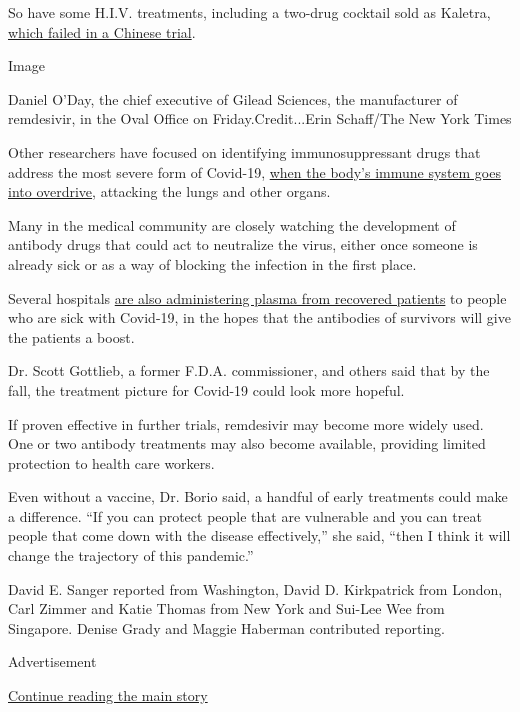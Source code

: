 So have some H.I.V. treatments, including a two-drug cocktail sold as
Kaletra,
\href{https://www.nytimes.com/2020/03/18/health/coronavirus-antiviral-drugs-fail.html}{which
failed in a Chinese trial}.

Image

Daniel O'Day, the chief executive of Gilead Sciences, the manufacturer
of remdesivir, in the Oval Office on Friday.Credit...Erin Schaff/The New
York Times

Other researchers have focused on identifying immunosuppressant drugs
that address the most severe form of Covid-19,
\href{https://www.nytimes.com/2020/04/01/health/coronavirus-cytokine-storm-immune-system.html}{when
the body's immune system goes into overdrive}, attacking the lungs and
other organs.

Many in the medical community are closely watching the development of
antibody drugs that could act to neutralize the virus, either once
someone is already sick or as a way of blocking the infection in the
first place.

Several hospitals
\href{https://slack-redir.net/link?url=https\%3A\%2F\%2Fwww.nytimes.com\%2F2020\%2F03\%2F26\%2Fhealth\%2Fplasma-coronavirus-treatment.html}{are
also administering plasma from recovered patients} to people who are
sick with Covid-19, in the hopes that the antibodies of survivors will
give the patients a boost.

Dr. Scott Gottlieb, a former F.D.A. commissioner, and others said that
by the fall, the treatment picture for Covid-19 could look more hopeful.

If proven effective in further trials, remdesivir may become more widely
used. One or two antibody treatments may also become available,
providing limited protection to health care workers.

Even without a vaccine, Dr. Borio said, a handful of early treatments
could make a difference. ``If you can protect people that are vulnerable
and you can treat people that come down with the disease effectively,''
she said, ``then I think it will change the trajectory of this
pandemic.''

David E. Sanger reported from Washington, David D. Kirkpatrick from
London, Carl Zimmer and Katie Thomas from New York and Sui-Lee Wee from
Singapore. Denise Grady and Maggie Haberman contributed reporting.

Advertisement

\protect\hyperlink{after-bottom}{Continue reading the main story}

